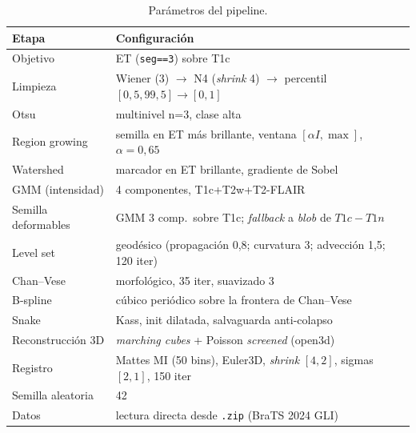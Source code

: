 \documentclass[conference]{IEEEtran}
\begin{document}
\begin{table}[h]
\centering
\caption{Parámetros del pipeline.}
\label{tab:repro}
\begin{tabularx}{\columnwidth}{lX}
\toprule
Etapa & Configuración \\
\midrule
Objetivo & ET (\texttt{seg==3}) sobre T1c \\
Limpieza & Wiener (3) $\to$ N4 (\textit{shrink} 4) $\to$ percentil $[0{,}5,99{,}5]\to[0,1]$ \\
Otsu & multinivel n=3, clase alta \\
Region growing & semilla en ET más brillante, ventana $[\alpha I,\max]$, $\alpha=0{,}65$ \\
Watershed & marcador en ET brillante, gradiente de Sobel \\
GMM (intensidad) & 4 componentes, T1c+T2w+T2-FLAIR \\
Semilla deformables & GMM 3 comp.\ sobre T1c; \emph{fallback} a \emph{blob} de $T1c-T1n$ \\
Level set & geodésico (propagación 0,8; curvatura 3; advección 1,5; 120 iter) \\
Chan--Vese & morfológico, 35 iter, suavizado 3 \\
B-spline & cúbico periódico sobre la frontera de Chan--Vese \\
Snake & Kass, init dilatada, salvaguarda anti-colapso \\
Reconstrucción 3D & \textit{marching cubes} + Poisson \emph{screened} (open3d) \\
Registro & Mattes MI (50 bins), Euler3D, \textit{shrink} $[4,2]$, sigmas $[2,1]$, 150 iter \\
Semilla aleatoria & 42 \\
Datos & lectura directa desde \texttt{.zip} (BraTS 2024 GLI) \\
\bottomrule
\end{tabularx}
\end{table}

\end{document}
